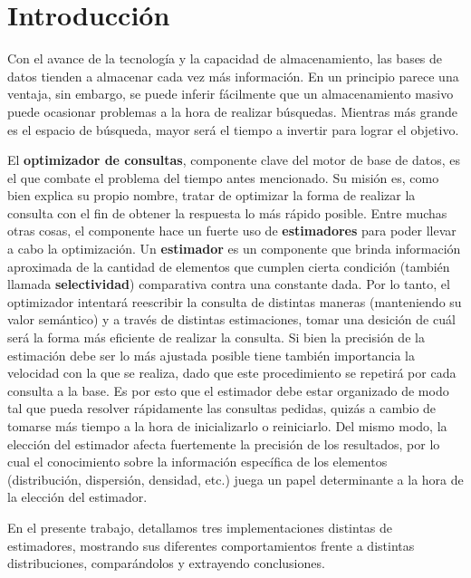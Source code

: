 \section{Introducción}
Con el avance de la tecnología y la capacidad de almacenamiento, las bases de datos tienden a almacenar cada vez más información. En un principio parece una ventaja, sin embargo, se puede inferir fácilmente que un almacenamiento masivo puede ocasionar problemas a la hora de realizar búsquedas. Mientras más grande es el espacio de búsqueda, mayor será el tiempo a invertir para lograr el objetivo.

El \textbf{optimizador de consultas}, componente clave del motor de base de datos, es el que combate el problema del tiempo antes mencionado. Su misión es, como bien explica su propio nombre, tratar de optimizar la forma de realizar la consulta con el fin de obtener la respuesta lo más rápido posible. Entre muchas otras cosas, el componente hace un fuerte uso de \textbf{estimadores} para poder llevar a cabo la optimización. Un \textbf{estimador} es un componente que brinda información aproximada de la cantidad de elementos que cumplen cierta condición (también llamada \textbf{selectividad}) comparativa contra una constante dada. Por lo tanto, el optimizador intentará reescribir la consulta de distintas maneras (manteniendo su valor semántico) y a través de distintas estimaciones, tomar una desición de cuál será la forma más eficiente de realizar la consulta. Si bien la precisión de la estimación debe ser lo más ajustada posible tiene también importancia la velocidad con la que se realiza, dado que este procedimiento se repetirá por cada consulta a la base. Es por esto que el estimador debe estar organizado de modo tal que pueda resolver rápidamente las consultas pedidas, quizás a cambio de tomarse más tiempo a la hora de inicializarlo o reiniciarlo. Del mismo modo, la elección del estimador afecta fuertemente la precisión de los resultados, por lo cual el conocimiento sobre la información específica de los elementos (distribución, dispersión, densidad, etc.) juega un papel determinante a la hora de la elección del estimador.

En el presente trabajo, detallamos tres implementaciones distintas de estimadores, mostrando sus diferentes comportamientos frente a distintas distribuciones, comparándolos y extrayendo conclusiones.